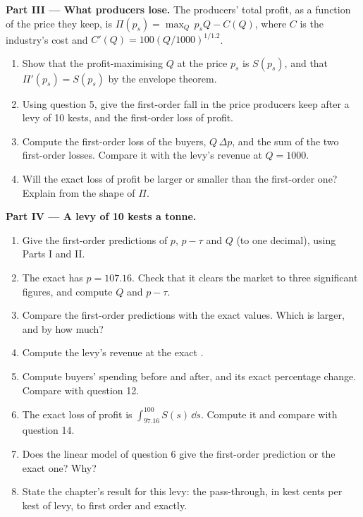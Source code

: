 \begin{problem}
\medskip\noindent\textbf{Part III --- What producers lose.}
The producers' total profit, as a function of the price they keep, is
$\Pi(p_s) = \max_Q\, p_s Q - C(Q)$, where $C$ is the industry's cost and
$C'(Q) = 100(Q/1000)^{1/1.2}$.
\begin{enumerate}[resume]
  \item Show that the profit-maximising $Q$ at the price $p_s$ is $S(p_s)$, and that $\Pi'(p_s) = S(p_s)$ by the envelope theorem.
  \item Using question 5, give the first-order fall in the price producers keep after a levy of 10 kests, and the first-order loss of profit.
  \item Compute the first-order loss of the buyers, $Q\,\Delta p$, and the sum of the two first-order losses. Compare it with the levy's revenue at $Q = 1000$.
  \item Will the exact loss of profit be larger or smaller than the first-order one? Explain from the shape of $\Pi$.
\end{enumerate}

\medskip\noindent\textbf{Part IV --- A levy of 10 kests a tonne.}
\begin{enumerate}[resume]
  \item Give the first-order predictions of $p$, $p - \tau$ and $Q$ (to one decimal), using Parts I and II.
  \item The exact  has $p = 107.16$. Check that it clears the market to three significant figures, and compute $Q$ and $p - \tau$.
  \item Compare the first-order predictions with the exact values. Which is larger, and by how much?
  \item Compute the levy's revenue at the exact .
  \item Compute buyers' spending before and after, and its exact percentage change. Compare with question 12.
  \item The exact loss of profit is $\int_{97.16}^{100} S(s)\,\dd s$. Compute it and compare with question 14.
  \item Does the linear model of question 6 give the first-order prediction or the exact one? Why?
  \item State the chapter's result for this levy: the pass-through, in kest cents per kest of levy, to first order and exactly.
\end{enumerate}
\end{problem}
